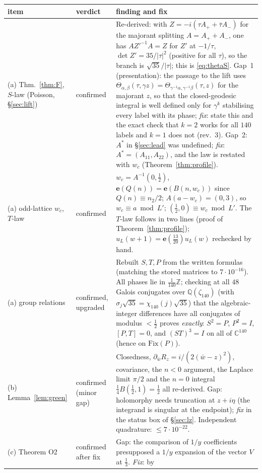 \documentclass[11pt]{article}
\theoremstyle{definition}
\theoremstyle{plain}
\newcommand{\Q}{\mathbb{Q}}
\newcommand{\Z}{\mathbb{Z}}
\newcommand{\C}{\mathbb{C}}
\newcommand{\e}{\mathbf{e}}
\begin{document}
\begin{center}\small
\begin{longtable}{p{3.6cm}p{1.9cm}p{9.2cm}}\toprule
item & verdict & finding and fix\\\midrule\endhead
(a) Thm.~\ref{thm:F}, $S$-law (Poisson, \S\ref{sec:lift}) & confirmed & Re-derived: with $Z=-i(\tau A_++\bar\tau A_-)$ for the majorant splitting $A=A_++A_-$, one has
$AZ'^{-1}A=Z$ for $Z'$ at $-1/\tau$, $\det Z'=35/|\tau|^2$ (positive for all $\tau$), so the branch is $\sqrt{35}/|\tau|$; this is \eqref{eq:thetaS}. Gap~1 (presentation):
the passage to the lift uses $\Theta_{\alpha,\beta}(\tau,\gamma z)=\Theta_{\gamma^{-1}\alpha,\gamma^{-1}\beta}(\tau,z)$ for the majorant $z$, so that the closed-geodesic
integral is well defined only for $\gamma^k$ stabilising every label with its phase; \emph{fix}: state this and the exact check that $k=2$ works for all $140$
labels and $k=1$ does not (rev.~3). Gap~2: $A^*$ in \S\ref{sec:lead} was undefined; \emph{fix}: $A^*=(A_{11},A_{22})$, and the law is restated with $w_c$
(Theorem~\ref{thm:profile}).\\
(a) odd-lattice $w_c$, $T$-law & confirmed & $w_c=A^{-1}(0,\tfrac12)$, $\e(Q(n))=\e(B(n,w_c))$ since $Q(n)\equiv n_2/2$; $A(a-w_c)=(0,3)$, so $w_c\equiv a\bmod L'$;
$(\tfrac12,0)\equiv w_c\bmod L'$. The $T$-law follows in two lines (proof of Theorem~\ref{thm:profile}); $u_L(w+1)=\e(\tfrac{13}{20})u_L(w)$ rechecked by hand.\\
(a) group relations & confirmed, upgraded & Rebuilt $S,T,P$ from the written formulas (matching the stored matrices to $7\cdot10^{-16}$). All phases lie in
$\tfrac1{140}\Z$; checking at all $48$ Galois conjugates over $\Q(\zeta_{140})$ (with $\sigma_j\sqrt{35}=\chi_{140}(j)\sqrt{35}$) that the algebraic-integer differences have
all conjugates of modulus $<\tfrac12$ proves \emph{exactly}: $S^2=P$, $P^2=I$, $[P,T]=0$, and $(ST)^3=I$ on all of $\C^{140}$ (hence on $\mathrm{Fix}(P)$).\\
(b) Lemma~\ref{lem:green} & confirmed (minor gap) & Closedness, $\partial_{\bar w}R_z=i/(2(\bar w-z)^2)$, covariance, the $n<0$ argument, the Laplace limit $\pi/2$ and the
$n=0$ integral $\tfrac14B(\tfrac12,1)=\tfrac12$ all re-derived. Gap: holomorphy needs truncation at $z+i\eta$ (the integrand is singular at the endpoint); \emph{fix} in
the status box of \S\ref{sec:lz}. Independent quadrature: $\le7\cdot10^{-22}$.\\
(c) Theorem O2 & confirmed after fix & Gap: the comparison of $1/y$ coefficients presupposed a $1/y$ expansion of the vector $V$ at $\tfrac13$. \emph{Fix}: by

\end{longtable}
\end{center}
\end{document}

